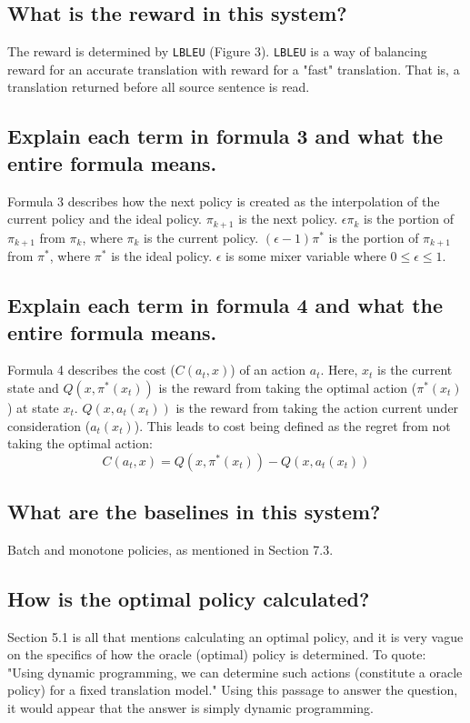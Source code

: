 \documentclass{article}
\begin{document}
\subsection{What is the reward in this system?}
The reward is determined by \texttt{LBLEU} (Figure 3). \texttt{LBLEU} is a way of balancing reward for an accurate translation with reward for a "fast" translation. That is, a translation returned before all source sentence is read. 

\subsection{Explain each term in formula 3 and what the entire formula means.}
Formula 3 describes how the next policy is created as the interpolation of the current policy and the ideal policy. $\pi_{k+1}$ is the next policy. $\epsilon\pi_k$ is the portion of $\pi_{k+1}$ from $\pi_k$, where $\pi_k$ is the current policy. $(\epsilon-1)\pi^*$ is the portion of $\pi_{k+1}$ from $\pi^*$, where $\pi^*$ is the ideal policy. $\epsilon$ is some mixer variable where $0 \leq \epsilon \leq 1$.

\subsection{Explain each term in formula 4 and what the entire formula means.}
Formula 4 describes the cost ($C(a_t, x)$) of an action $a_t$. Here, $x_t$ is the current state and $Q(x,\pi^*(x_t))$ is the reward from taking the optimal action ($\pi^*(x_t)$) at state $x_t$. $Q(x,a_t(x_t))$ is the reward from taking the action current under consideration ($a_t(x_t)$). This leads to cost being defined as the regret from not taking the optimal action: \[C(a_t, x) = Q(x,\pi^*(x_t)) -  Q(x,a_t(x_t))\]

\subsection{What are the baselines in this system?}
Batch and monotone policies, as mentioned in Section 7.3. 

\subsection{How is the optimal policy calculated?}
Section 5.1 is all that mentions calculating an optimal policy, and it is very vague on the specifics of how the oracle (optimal) policy is determined. To quote: "Using dynamic programming, we can determine such actions (constitute a oracle policy) for a fixed translation model." Using this passage to answer the question, it would appear that the answer is simply dynamic programming. 
\end{document}
